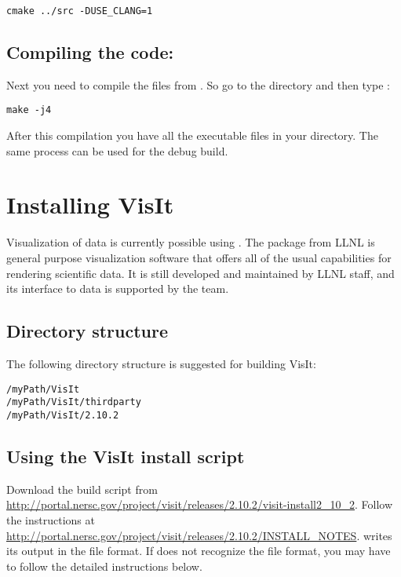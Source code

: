 \documentclass[11pt,fleqn]{book} %
\begin{document}
\begin{lstlisting}[backgroundcolor=\color{background}]
    cmake ../src -DUSE_CLANG=1
\end{lstlisting}

\section{Compiling the code:}
Next you need to compile the files from . So go to the  directory and then type : 
\begin{lstlisting}[backgroundcolor=\color{background}]
make -j4
\end{lstlisting}

After this compilation you have all the executable files in your  directory.
The same process can  be used for the debug build.

\chapter{Installing VisIt}
Visualization of \GranularSim data is currently possible using
\Visit. The \Visit package from LLNL is general purpose
visualization software that offers all of the usual capabilities for
rendering scientific data.  It is still developed and maintained by
LLNL staff, and its interface to \GranularSim data is supported by
the \VTK team. 

\section{Directory structure}
The following directory structure is suggested for building VisIt:

\begin{lstlisting}[backgroundcolor=\color{background}]
/myPath/VisIt
/myPath/VisIt/thirdparty
/myPath/VisIt/2.10.2
\end{lstlisting}

\section{Using the VisIt install script}
Download the build script from \\
\url{http://portal.nersc.gov/project/visit/releases/2.10.2/visit-install2_10_2}.
Follow the instructions at \url{http://portal.nersc.gov/project/visit/releases/2.10.2/INSTALL_NOTES}.
\GranularSim writes its output in the \VTK file format.  If \Visit does not recognize the
\VTK file format, you may have to follow the detailed instructions below.
\end{document}
